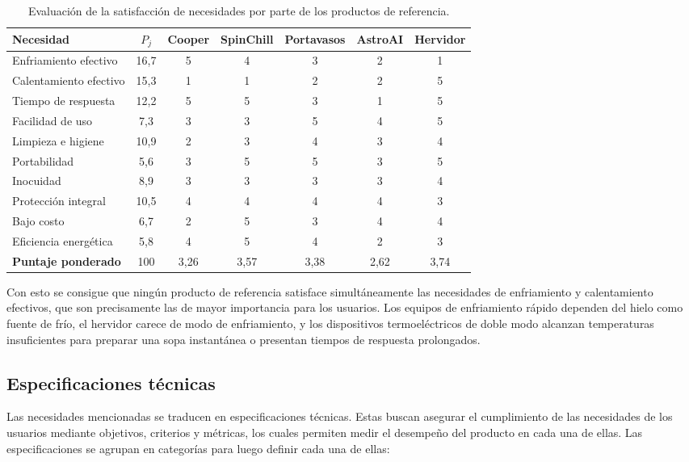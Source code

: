 \documentclass[12pt, a4paper]{article}
\begin{document}
\begin{table}[H]
\centering
\small
\begin{tabular}{lcccccc}
\toprule
\textbf{Necesidad} & $P_j$ & \textbf{Cooper} & \textbf{SpinChill} & \textbf{Portavasos} & \textbf{AstroAI} & \textbf{Hervidor} \\
\midrule
Enfriamiento efectivo   & 16,7 & 5 & 4 & 3 & 2 & 1 \\
Calentamiento efectivo  & 15,3 & 1 & 1 & 2 & 2 & 5 \\
Tiempo de respuesta     & 12,2 & 5 & 5 & 3 & 1 & 5 \\
Facilidad de uso        & 7,3  & 3 & 3 & 5 & 4 & 5 \\
Limpieza e higiene      & 10,9 & 2 & 3 & 4 & 3 & 4 \\
Portabilidad            & 5,6  & 3 & 5 & 5 & 3 & 5 \\
Inocuidad               & 8,9  & 3 & 3 & 3 & 3 & 4 \\
Protección integral     & 10,5 & 4 & 4 & 4 & 4 & 3 \\
Bajo costo              & 6,7  & 2 & 5 & 3 & 4 & 4 \\
Eficiencia energética   & 5,8  & 4 & 5 & 4 & 2 & 3 \\
\midrule
\textbf{Puntaje ponderado} & 100 & 3,26 & 3,57 & 3,38 & 2,62 & 3,74 \\
\bottomrule
\end{tabular}
\caption{Evaluación de la satisfacción de necesidades por parte de los productos de referencia.}
\label{tab:competencia_necesidades}
\end{table}

Con esto se consigue que ningún producto de referencia satisface simultáneamente las necesidades de enfriamiento y calentamiento efectivos, que son precisamente las de mayor importancia para los usuarios. Los equipos de enfriamiento rápido dependen del hielo como fuente de frío, el hervidor carece de modo de enfriamiento, y los dispositivos termoeléctricos de doble modo alcanzan temperaturas insuficientes para preparar una sopa instantánea o presentan tiempos de respuesta prolongados.

\subsection{Especificaciones técnicas}
Las necesidades mencionadas se traducen en especificaciones técnicas. Estas buscan asegurar el cumplimiento de las necesidades de los usuarios mediante objetivos, criterios y métricas, los cuales permiten medir el desempeño del producto en cada una de ellas. Las especificaciones se agrupan en categorías para luego definir cada una de ellas:
\end{document}
